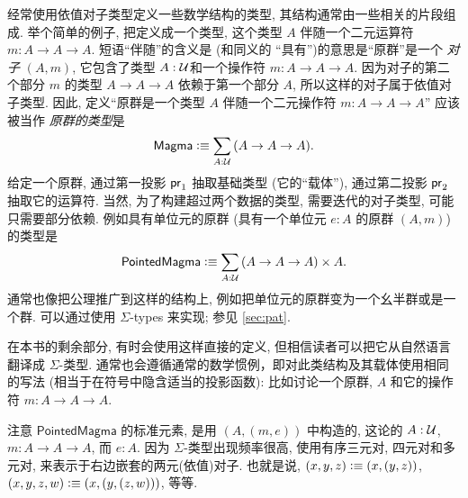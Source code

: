 经常使用依值对子类型定义一些数学结构的类型, 其结构通常由一些相关的片段组成.
举个简单的例子, 把定义成一个类型, 这个类型 $A$ 伴随一个二元运算符 $m:A\to A\to A$.
短语``伴随''的含义是 (和同义的 ``具有'')的意思是``原群''是一个 \emph{对子} $(A,m)$, 它包含了类型 $A:\mathcal{U}$和一个操作符 $m:A\to A\to A$.
因为对子的第二个部分 $m$ 的类型 $A\to A\to A$ 依赖于第一个部分 $A$, 所以这样的对子属于依值对子类型.
因此, 定义``原群是一个类型 $A$ 伴随一个二元操作符 $m:A\to A\to A$'' 应该被当作 \emph{原群的类型}是
\[
    \mathsf{Magma} \defeq \sm{A:\UU} (A\to A\to A).
\]
给定一个原群, 通过第一投影 $\mathsf{pr}_{1}$ 抽取基础类型 (它的``载体''), 通过第二投影 $\mathsf{pr}_{2}$ 抽取它的运算符.
当然, 为了构建超过两个数据的类型, 需要迭代的对子类型, 可能只需要部分依赖.
例如具有单位元的原群 (具有一个单位元 $e:A$ 的原群 $(A,m)$) 的类型是
\[
    \mathsf{PointedMagma} \defeq \sm{A:\UU} (A\to A\to A) \times A.
\]
通常也像把公理推广到这样的结构上, 例如把单位元的原群变为一个幺半群或是一个群.
可以通过使用 $\Sigma$-types 来实现;
参见 \cref{sec:pat}.

在本书的剩余部分, 有时会使用这样直接的定义, 但相信读者可以把它从自然语言翻译成 $\Sigma$-类型.
通常也会遵循通常的数学惯例，即对此类结构及其载体使用相同的写法 (相当于在符号中隐含适当的投影函数): 比如讨论一个原群, $A$ 和它的操作符 $m:A\to A\to A$.

注意 $\mathsf{PointedMagma}$ 的标准元素, 是用 $(A,(m,e))$ 中构造的, 这论的 $A:\mathcal{U}$, $m:A\to A\to A$, 而 $e:A$.
因为 $\Sigma$-类型出现频率很高, 使用有序三元对, 四元对和多元对, 来表示于右边嵌套的两元(依值)对子.
也就是说, $(x,y,z) \vcentcolon\equiv (x,(y,z))$, $(x,y,z,w)\vcentcolon\equiv (x,(y,(z,w)))$, 等等.

%